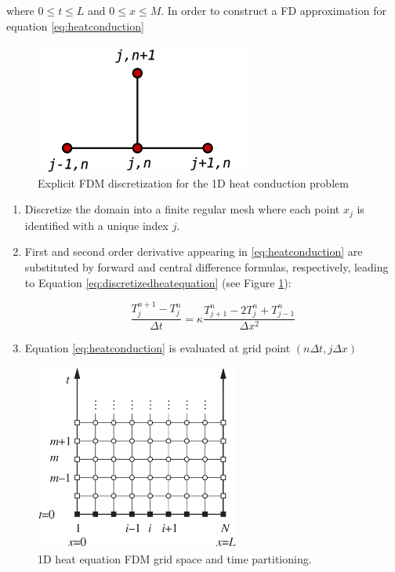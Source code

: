     where $0 \leq t \leq L$ and $0 \leq x \leq
    M$. 
 In order to construct a FD approximation for equation \ref{eq:heatconduction} 
 
 \begin{figure}[b]
 	\centering
 	\includegraphics[scale=0.5]{./images/CA_FDM/heatstencil}
 	\caption{Explicit FDM discretization for the 1D heat conduction problem}\label{torus}
 	\label{fig:fdmheatequationstencil}
 
 \end{figure}   
 
 \begin{enumerate}
 
 \item Discretize the domain into a finite regular mesh where each point $x_j$ is identified with a unique index $j$.
    
 \item  First and second order derivative appearing in \ref{eq:heatconduction} are substituted by forward and central difference formulas, respectively, leading to Equation \ref{eq:discretizedheatequation} (see Figure  \ref{fig:fdmheatequationstencil}):
 
 \begin{equation}
  \frac{T^{n+1}_{j} - T^n_{j}}{\Delta t} = \kappa \frac{T^n_{j+1}- 2T^n_{j} + T^n_{j-1}}{\Delta x^2}
 \label{eq:discretizedheatequation}
 \end{equation}
 
 \item Equation \ref{eq:heatconduction} is evaluated at grid point $(n\Delta t, j \Delta x)$ 
    
\end{enumerate}    
    

    
\begin{figure}
\centering
\includegraphics[width=0.6\textwidth]{./images/CA_FDM/fdmgrid}
\caption{1D heat equation FDM grid space and time partitioning.}\label{torus}
\end{figure}

